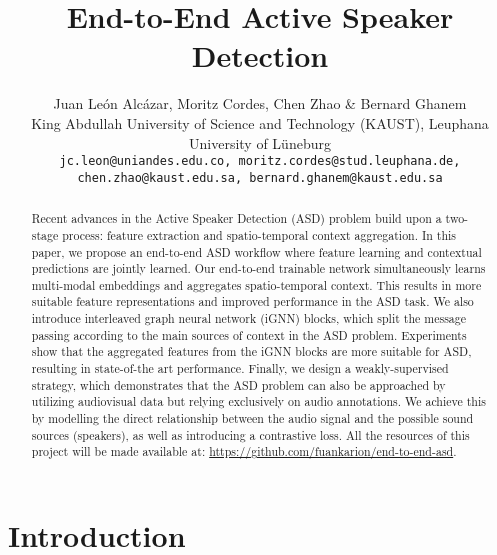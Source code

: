 \documentclass[10pt,twocolumn,letterpaper]{article}
\begin{document}
\title{End-to-End Active Speaker Detection }


\author{
    Juan León Alcázar, Moritz Cordes, Chen Zhao \& Bernard Ghanem\\
    \small  King Abdullah University of Science and Technology (KAUST), Leuphana University of Lüneburg\\
    {\tt\small jc.leon@uniandes.edu.co, moritz.cordes@stud.leuphana.de, chen.zhao@kaust.edu.sa, bernard.ghanem@kaust.edu.sa}
}

\maketitle
\ificcvfinal\thispagestyle{empty}\fi

\begin{abstract}
    Recent advances in the Active Speaker Detection (ASD) problem build upon a two-stage process: feature extraction and spatio-temporal context aggregation. In this paper, we propose an end-to-end ASD workflow where 
    feature learning and contextual predictions are  jointly learned. Our end-to-end trainable     network simultaneously learns multi-modal embeddings and aggregates spatio-temporal context. This results in more suitable feature representations and improved performance in the ASD task. We also introduce interleaved graph neural network (iGNN) blocks, which split the message passing according to the main sources of context in the ASD problem.
    Experiments show that the aggregated features from the iGNN blocks are more suitable for ASD, resulting in state-of-the art performance. 
    Finally, we design a weakly-supervised strategy, which demonstrates that the ASD problem can also be approached by utilizing audiovisual data but relying exclusively on audio annotations. We achieve this by  modelling the direct relationship between the audio signal and the possible sound sources (speakers), as well as introducing a contrastive loss. All the resources of this project will be made available at: \url{https://github.com/fuankarion/end-to-end-asd}.
\end{abstract}



\section{Introduction}
\end{document}
